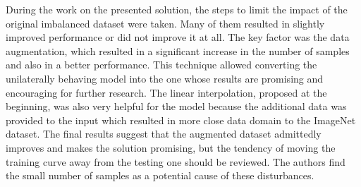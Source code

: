 During the work on the presented solution, the steps to limit the impact of the original imbalanced dataset were taken.
Many of them resulted in slightly improved performance or did not improve it at all.
The key factor was the data augmentation, which resulted in a significant increase in the number of samples and also in a better performance.
This technique allowed converting the unilaterally behaving model into the one whose results are promising and encouraging for further research.
The linear interpolation, proposed at the beginning, was also very helpful for the model because the additional data was provided to the input which resulted in more close data domain to the ImageNet dataset.
The final results suggest that the augmented dataset admittedly improves and makes the solution promising, but the tendency of moving the training curve away from the testing one should be reviewed.
The authors find the small number of samples as a potential cause of these disturbances.
